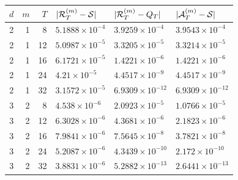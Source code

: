 \begin{tabular}{rrrlll}
\toprule
$d$&$m$&$T$&$|\mathcal R_T^{(m)}-\mathcal S|$&$|\mathcal R_T^{(m)}-Q_T|$&$|\mathcal A_T^{(m)}-\mathcal S|$\\
\midrule
2 & 1 & 8 & $5.1888\times 10^{-4}$ & $3.9259\times 10^{-4}$ & $3.9543\times 10^{-4}$ \\
2 & 1 & 12 & $5.0987\times 10^{-5}$ & $3.3205\times 10^{-5}$ & $3.3214\times 10^{-5}$ \\
2 & 1 & 16 & $6.1721\times 10^{-5}$ & $1.4221\times 10^{-6}$ & $1.4221\times 10^{-6}$ \\
2 & 1 & 24 & $4.21\times 10^{-5}$ & $4.4517\times 10^{-9}$ & $4.4517\times 10^{-9}$ \\
2 & 1 & 32 & $3.1572\times 10^{-5}$ & $6.9309\times 10^{-12}$ & $6.9309\times 10^{-12}$ \\
3 & 2 & 8 & $4.538\times 10^{-6}$ & $2.0923\times 10^{-5}$ & $1.0766\times 10^{-5}$ \\
3 & 2 & 12 & $6.3028\times 10^{-6}$ & $4.3681\times 10^{-6}$ & $2.1823\times 10^{-6}$ \\
3 & 2 & 16 & $7.9841\times 10^{-6}$ & $7.5645\times 10^{-8}$ & $3.7821\times 10^{-8}$ \\
3 & 2 & 24 & $5.2087\times 10^{-6}$ & $4.3439\times 10^{-10}$ & $2.172\times 10^{-10}$ \\
3 & 2 & 32 & $3.8831\times 10^{-6}$ & $5.2882\times 10^{-13}$ & $2.6441\times 10^{-13}$ \\
\bottomrule
\end{tabular}
